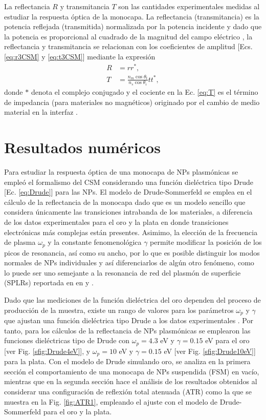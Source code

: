 \documentclass[letterpaper,11pt] {article}
\begin{document}
La reflectancia $R$ y transmitancia $T$ son las cantidades experimentales medidas al estudiar la respuesta óptica de la monocapa.  La reflectancia (transmitancia) es la potencia reflejada (transmitida) normalizada por la potencia incidente \cite{griffiths2013electrodynamics} y dado que la potencia es proporcional al cuadrado de la magnitud del campo eléctrico \cite{griffiths2013electrodynamics}, la reflectancia y transmitancia se relacionan con los coeficientes de amplitud [Ecs.  \eqref{eq:r3CSM} y \eqref{eq:t3CSM}] mediante la expresión 
	\begin{align}
	R &= r r^*,\label{eq:R}\\
	T &= \frac{n_m \cos\theta_t}{n_s \cos\theta_i} t t^*  ,\label{eq:T}
	\end{align}
donde  $*$ denota el complejo conjugado y el cociente en la Ec.  \eqref{eq:T} es el término de impedancia (para materiales no magnéticos) originado por el cambio de medio material en la interfaz \cite{griffiths2013electrodynamics}. 

\section{Resultados numéricos}

	Para estudiar la respuesta óptica de una monocapa de NPs plasmónicas se empleó el formalismo del CSM considerando una función dieléctrica tipo Drude [Ec. \eqref{eq:Drude}] para las NPs. El modelo de Drude-Sommerfeld se emplea en el cálculo de la reflectancia de la monocapa dado que es un modelo sencillo que considera únicamente las transiciones intrabanda de los materiales, a diferencia de los datos experimentales para el oro y la plata en donde transiciones electrónicas más complejas están presentes. Asimimo, la elección de la frecuencia de plasma $\omega_p$ y la constante fenomenológica $\gamma$ permite modificar la posición de los picos de resonancia, así como su ancho, por lo que es posible distinguir los modos normales de NPs individuales y así diferenciarlos de algún otro fenómeno, como lo puede ser uno semejante a la resonancia de red del plasmón de superficie (SPLRs) reportada en en \cite{kabashin2009plasmonic} y \cite{danilov2018ultra}.
	
	 Dado que las mediciones de la función dieléctrica del oro dependen del proceso de producción de la muestra,  existe un rango de valores para los parámetros  $\omega_p$ y $\gamma$ que ajustan una función dieléctrica tipo Drude a los datos experimentales \cite{svetovoy2008optical}. Por tanto, para los cálculos de la reflectancia de NPs plasmónicas se emplearon las funciones dieléctricas tipo de Drude con $\omega_p = 4.3$ eV y  $\gamma = 0.15$ eV para el oro [ver Fig. \ref{sfig:Drude4eV}], y $\omega_p = 10$ eV y  $\gamma = 0.15$ eV [ver Fig. \ref{sfig:Drude10eV}] para la plata.	Con el modelo de Drude simulando oro, se analiza en la primera sección el comportamiento de una monocapa de NPs suspendida (FSM)  en vacío, mientras que en la segunda sección hace el análisis de los resultados obtenidos al considerar una configuración de reflexión total atenuada (ATR) como la que se muestra en la Fig. \ref{fig:ATR1}, empleando el ajuste con el modelo de Drude-Sommerfeld para el oro y la plata.
\end{document}
